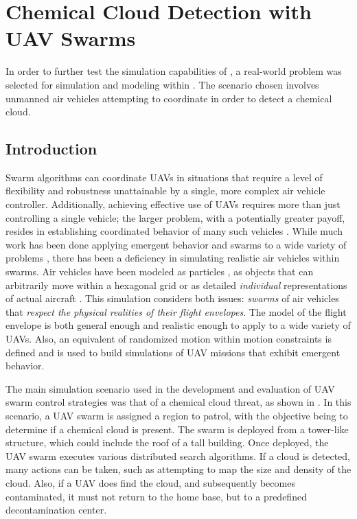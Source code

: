 \section{Chemical Cloud Detection with UAV Swarms}

In order to further test the simulation capabilities of \SWEEP{}, a real-world problem was selected for simulation and modeling within \SWEEP{}.  The scenario chosen involves unmanned air vehicles attempting to coordinate in order to detect a chemical cloud.

\subsection{Introduction}

Swarm algorithms can coordinate UAVs in situations that require a level of flexibility and robustness unattainable by a single, more complex air vehicle controller.  Additionally, achieving effective use of UAVs requires more than just controlling a single vehicle; the larger problem, with a potentially greater payoff, resides in establishing coordinated behavior of many such vehicles \cite{clough:SwarmingUAVs}. While much work has been done applying emergent behavior and swarms to a wide variety of problems \cite{palmer:Behavior, bonabeau:SwarmSmarts, lewis:Nanorobots, balch:FormationControl, orbital:SatelliteSwarms, go:AutonomousBehaviors}, there has been a deficiency in simulating realistic air vehicles within swarms. Air vehicles have been modeled as particles \cite{trahan:UAVSwarms}, as objects that can arbitrarily move within a hexagonal grid \cite{parunak:DigitalPheromone} or as detailed \textit{individual} representations of actual aircraft \cite{isreal:PredatorModeling}.  This simulation considers both issues: \textit{swarms} of air vehicles that \textit{respect the physical realities of their flight envelopes}. The model of the flight envelope is both general enough and realistic enough to apply to a wide variety of UAVs.  Also, an equivalent of randomized motion within motion constraints is defined and is used to build simulations of UAV missions that exhibit emergent behavior.

The main simulation scenario used in the development and evaluation of UAV swarm control strategies was that of a chemical cloud threat, as shown in . In this scenario, a UAV swarm is assigned a region to patrol, with the objective being to determine if a chemical cloud is present. The swarm is deployed from a tower-like structure, which could include the roof of a tall building. Once deployed, the UAV swarm executes various distributed search algorithms. If a cloud is detected, many actions can be taken, such as attempting to map the size and density of the cloud. Also, if a UAV does find the cloud, and subsequently becomes contaminated, it must not return to the home base, but to a predefined decontamination center.

